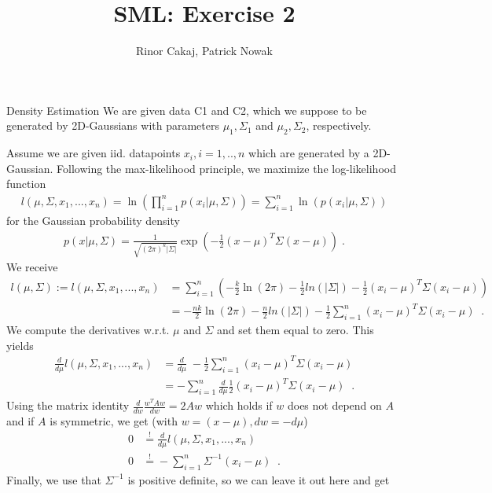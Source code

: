 \documentclass[
ngerman,
]{tudaexercise}
\newcommand{\sni}{\sum_{i=1}^{n}}
\begin{document}
	
	\title[Uebung]{SML: Exercise 2}
	\author{Rinor Cakaj, Patrick Nowak}
	
	\maketitle
	
	\begin{task}{Density Estimation}
		We are given data C1 and C2, which we suppose to be generated by 2D-Gaussians with parameters ${\mu_1,\Sigma_1}$ and ${\mu_2,\Sigma_2}$, respectively.
		\begin{subtask}
			Assume we are given iid. datapoints $x_i, i=1,..,n$ which are generated by a 2D-Gaussian. Following the max-likelihood principle, we maximize the log-likelihood function
			\begin{align*}
				l(\mu,\Sigma,x_1,...,x_n)=\ln(\prod_{i=1}^n p(x_i|\mu,\Sigma))=\sni\ln(p(x_i|\mu,\Sigma))
			\end{align*}
			for the Gaussian probability density
			\begin{align}\label{gaussian} p(x|\mu,\Sigma)=\frac{1}{\sqrt{(2\pi)^k|\Sigma|}}\exp\left( -\frac{1}{2}(x-\mu)^T\Sigma(x-\mu)\right)\;.
			\end{align}
			We receive
			\begin{align}
			l(\mu,\Sigma):=l(\mu,\Sigma,x_1,...,x_n)&=\sni\left( -\frac{k}{2}\ln(2\pi)-\frac{1}{2}ln(|\Sigma|)-\frac{1}{2}(x_i-\mu)^T\Sigma(x_i-\mu)\right) \\
			&=-\frac{nk}{2}\ln(2\pi)-\frac{n}{2}ln(|\Sigma|)-\frac{1}{2}\sni (x_i-\mu)^T\Sigma(x_i-\mu)\;\;.\label{lfkt}
			\end{align}
			We compute the derivatives w.r.t. $\mu$ and $\Sigma$ and set them equal to zero. This yields
			\begin{align*}
\frac{d}{d\mu}l(\mu,\Sigma,x_1,...,x_n)&=\frac{d}{d\mu}\; -\frac{1}{2}\sni (x_i-\mu)^T\Sigma (x_i-\mu)\\ &= -\sni \frac{d}{d\mu}\frac{1}{2}(x_i-\mu)^T\Sigma (x_i-\mu)\;\;.
			\end{align*}
			Using the matrix identity $\frac{d}{dw}\frac{w^T Aw}{dw}=2Aw$ which holds if $w$ does not depend on $A$ and if $A$ is symmetric, we get (with $w=(x-\mu), dw=-d\mu$)
			\begin{align*}
			0&\stackrel{!}{=}\frac{d}{d\mu}l(\mu,\Sigma,x_1,...,x_n)\\
			0&\stackrel{!}{=}-\sni \Sigma^{-1}(x_i-\mu)	\;\;.
			\end{align*}
			Finally, we use that $\Sigma^{-1}$ is positive definite, so we can leave it out here and get

\end{subtask}
\end{task}
\end{document}
